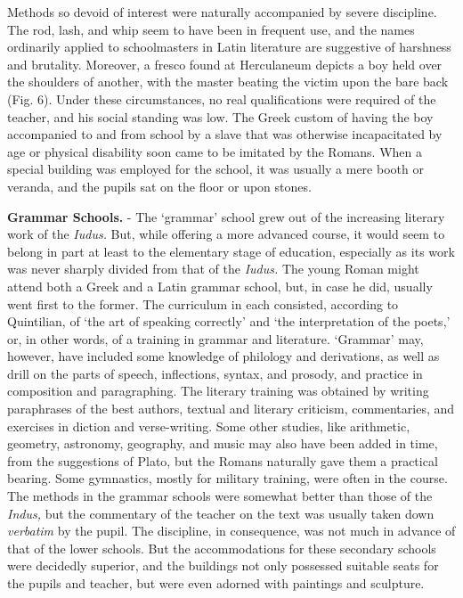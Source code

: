 \documentclass[]{book}
\begin{document}
Methods so devoid of interest were naturally accompanied by severe discipline. The rod, lash, and whip seem to have been in frequent use, and the names ordinarily applied to schoolmasters in Latin literature are suggestive of harshness and brutality. Moreover, a fresco found at Herculaneum depicts a boy held over the shoulders of another, with the master beating the victim upon the bare back (Fig. 6). Under these circumstances, no real qualifications were required of the teacher, and his social standing was low. The Greek custom of having the boy accompanied to and from school by a slave that was otherwise incapacitated by age or physical disability soon came to be imitated by the Romans. When a special building was employed for the school, it was usually a mere booth or veranda, and the pupils sat on the floor or upon stones.

\textbf{Grammar Schools.} - The `grammar' school grew out of the increasing literary work of the \emph{Iudus.} But, while offering a more advanced course, it would seem to belong in part at least to the elementary stage of education, especially as its work was never sharply divided from that of the \emph{Iudus.} The young Roman might attend both a Greek and a Latin grammar school, but, in case he did, usually went first to the former. The curriculum in each consisted, according to Quintilian, of `the art of speaking correctly' and `the interpretation of the poets,' or, in other words, of a training in grammar and literature. `Grammar' may, however, have included some knowledge of philology and derivations, as well as drill on the parts of speech, inflections, syntax, and prosody, and practice in composition and paragraphing. The literary training was obtained by writing paraphrases of the best authors, textual and literary criticism, commentaries, and exercises in diction and verse-writing. Some other studies, like arithmetic, geometry, astronomy, geography, and music may also have been added in time, from the suggestions of Plato, but the Romans naturally gave them a practical bearing. Some gymnastics, mostly for military training, were often in the course. The methods in the grammar schools were somewhat better than those of the \emph{Indus,} but the commentary of the teacher on the text was usually taken down \emph{verbatim} by the pupil. The discipline, in consequence, was not much in advance of that of the lower schools. But the accommodations for these secondary schools were decidedly superior, and the buildings not only possessed suitable seats for the pupils and teacher, but were even adorned with paintings and sculpture.
\end{document}

